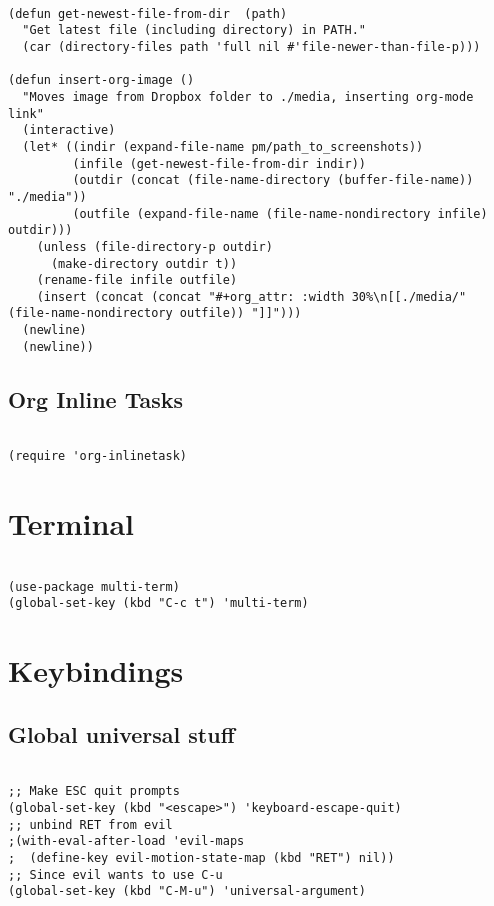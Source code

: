 \documentclass[11pt]{article}
\begin{document}
\begin{verbatim}

(defun get-newest-file-from-dir  (path)
  "Get latest file (including directory) in PATH."
  (car (directory-files path 'full nil #'file-newer-than-file-p)))

(defun insert-org-image ()
  "Moves image from Dropbox folder to ./media, inserting org-mode link"
  (interactive)
  (let* ((indir (expand-file-name pm/path_to_screenshots))
		 (infile (get-newest-file-from-dir indir))
		 (outdir (concat (file-name-directory (buffer-file-name)) "./media"))
		 (outfile (expand-file-name (file-name-nondirectory infile) outdir)))
	(unless (file-directory-p outdir)
	  (make-directory outdir t))
	(rename-file infile outfile)
	(insert (concat (concat "#+org_attr: :width 30%\n[[./media/" (file-name-nondirectory outfile)) "]]")))
  (newline)
  (newline))

\end{verbatim}

\subsection{Org Inline Tasks}
\label{sec:org77edb94}
\begin{verbatim}

(require 'org-inlinetask)

\end{verbatim}

\section{Terminal}
\label{sec:org1e4dc0e}
\begin{verbatim}

(use-package multi-term)
(global-set-key (kbd "C-c t") 'multi-term)

\end{verbatim}
\section{Keybindings}
\label{sec:orgaeac893}
\subsection{Global universal stuff}
\label{sec:orge7630b4}
\begin{verbatim}

;; Make ESC quit prompts
(global-set-key (kbd "<escape>") 'keyboard-escape-quit)
;; unbind RET from evil
;(with-eval-after-load 'evil-maps
;  (define-key evil-motion-state-map (kbd "RET") nil))
;; Since evil wants to use C-u
(global-set-key (kbd "C-M-u") 'universal-argument)

\end{verbatim}
\end{document}
